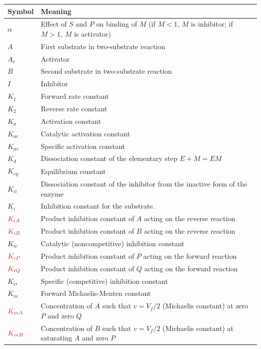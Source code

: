 \documentclass[10pt]{cekarticle}
\newcommand{\changed}[1]{\textcolor{BrickRed}{#1}}
\begin{document}
\renewcommand{\arraystretch}{1}
\begin{table}[ht]
  \begin{tabular}{lp{5.5in}}
    \toprule
    \textbf{Symbol} & \textbf{Meaning} \\
    \midrule
    $\alpha$	& Effect of $S$ and $P$ on binding of $M$ (if $M<1$, $M$ is inhibitor; if $M>1$, $M$ is activator) \\
    $A$		& First substrate in two-substrate reaction \\
    $A_c$	& Activator \\
    $B$		& Second substrate in two-substrate reaction \\
    $I$		& Inhibitor \\
    $K_1$	& Forward rate constant \\
    $K_2$	& Reverse rate constant \\
    $K_a$	& Activation constant \\
    $K_{ac}$	& Catalytic activation constant \\
    $K_{as}$	& Specific activation constant \\
    $K_d$	& Dissociation constant of the elementary step $E + M = EM$ \\
    $K_{eq}$	& Equilibrium constant \\
    $K_{ii}$	& Dissociation constant of the inhibitor from the inactive form of the enzyme \\
    $K_i$	& Inhibition constant for the substrate. \\
    $\changed{K_{iA}}$	& Product inhibition constant of $A$ acting on the reverse reaction \\
    $\changed{K_{iB}}$	& Product inhibition constant of $B$ acting on the reverse reaction \\
    $K_{ic}$	& Catalytic (noncompetitive) inhibition constant \\
    $\changed{K_{iP}}$	& Product inhibition constant of $P$ acting on the forward reaction \\
    $\changed{K_{iQ}}$	& Product inhibition constant of $Q$ acting on the forward reaction \\
    $K_{is}$	& Specific (competitive) inhibition constant \\
    $K_m$	& Forward Michaelis-Menten constant \\
    $\changed{K_{mA}}$	& Concentration of $A$ such that $v = V_f/2$  (Michaelis constant) at zero $P$ and zero $Q$ \\
    $\changed{K_{mB}}$	& Concentration of $B$ such that $v = V_f/2$  (Michaelis constant) at saturating $A$ and zero $P$ \\

\end{tabular}
\end{table}
\end{document}
